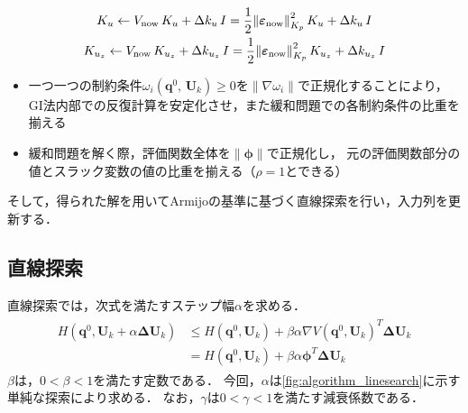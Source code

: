 \documentclass[autodetect-engine,dvipdfmx-if-dvi,ja=standard,a4j,jbase=11pt,magstyle=nomag*]{bxjsreport}
\begin{document}
\begin{equation}
    \label{eq:LM_Kuset_sugihara}
    \begin{gathered}
        K_u \gets V_{\mathrm{now}} \, K_u + \Delta k_u \, I = \frac{1}{2} {\left\| \bm{\varepsilon}_{\mathrm{now}} \right\|}^2_{K_p} \, K_u + \Delta k_u \, I \\
        K_{u_z} \gets V_{\mathrm{now}} \, K_{u_z} + \Delta k_{u_z} \, I = \frac{1}{2} {\left\| \bm{\varepsilon}_{\mathrm{now}} \right\|}^2_{K_p} \, K_{u_z} + \Delta k_{u_z} \, I
    \end{gathered}
\end{equation}
\begin{itemize}
    \item   一つ一つの制約条件$\omega_i(\bm{q}^0 ,\, \bm{U}_k) \geq 0$を$\| \nabla \omega_i \|$で正規化することにより，
            GI法内部での反復計算を安定化させ，また緩和問題での各制約条件の比重を揃える\cite{sugimoto_1985}
    \item   緩和問題を解く際，評価関数全体を$\| \bm{\phi} \|$で正規化し，
            元の評価関数部分の値とスラック変数の値の比重を揃える（$\rho = 1$とできる）
\end{itemize}
そして，得られた解を用いてArmijoの基準に基づく直線探索を行い，入力列を更新する．



\subsection{直線探索}
直線探索では，次式を満たすステップ幅$\alpha$を求める．
\begin{align}
    \label{eq:armijo}
    \begin{aligned}
        H \left( \bm{q}^0 , \bm{U}_k + \alpha \bm{\Delta U}_k \right) & \leq H \left( \bm{q}^0 , \bm{U}_k \right) + \beta \alpha {\nabla V \left( \bm{q}^0 , \bm{U}_k  \right)}^T \bm{\Delta U}_k \\
                                                                      &   =  H \left( \bm{q}^0 , \bm{U}_k \right) + \beta \alpha \bm{\phi}^T \bm{\Delta U}_k
    \end{aligned}
\end{align}
$\beta$は，$0 < \beta < 1$を満たす定数である．
今回，$\alpha$は\cref{fig:algorithm_linesearch}に示す単純な探索により求める．
なお，$\gamma$は$0 < \gamma < 1$を満たす減衰係数である．
\end{document}
